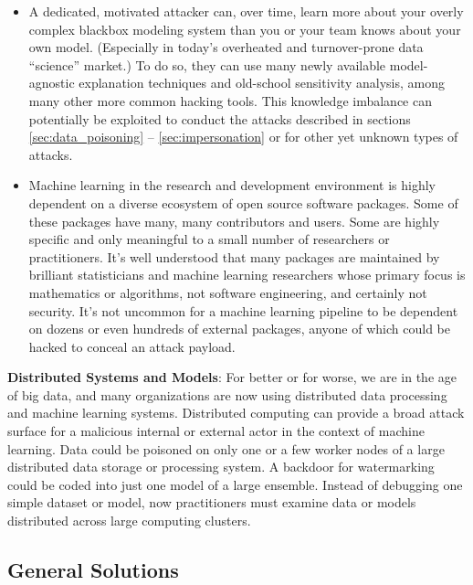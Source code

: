 \documentclass[fleqn]{article}
\begin{document}
\begin{itemize}

\item A dedicated, motivated attacker can, over time, learn more about your overly complex blackbox modeling system than you or your team knows about your own model. (Especially in today's overheated and turnover-prone data ``science'' market.) To do so, they can use many newly available model-agnostic explanation techniques and old-school sensitivity analysis, among many other more common hacking tools. This knowledge imbalance can potentially be exploited to conduct the attacks described in sections \ref{sec:data_poisoning} -- \ref{sec:impersonation} or for other yet unknown types of attacks. 

\item Machine learning in the research and development environment is highly dependent on a diverse ecosystem of open source software packages. Some of these packages have many, many contributors and users. Some are highly specific and only meaningful to a small number of researchers or practitioners. It's well understood that many packages are maintained by brilliant statisticians and machine learning researchers whose primary focus is mathematics or algorithms, not software engineering, and certainly not security. It's not uncommon for a machine learning pipeline to be dependent on dozens or even hundreds of external packages, anyone of which could be hacked to conceal an attack payload.
 
\end{itemize}

\noindent\textbf{Distributed Systems and Models}: For better or for worse, we are in the age of big data, and many organizations are now using distributed data processing and machine learning systems. Distributed computing can provide a broad attack surface for a malicious internal or external actor in the context of machine learning. Data could be poisoned on only one or a few worker nodes of a large distributed data storage or processing system. A backdoor for watermarking could be coded into just one model of a large ensemble. Instead of debugging one simple dataset or model, now practitioners must examine data or models distributed across large computing clusters.

\subsection{General Solutions}
\end{document}
